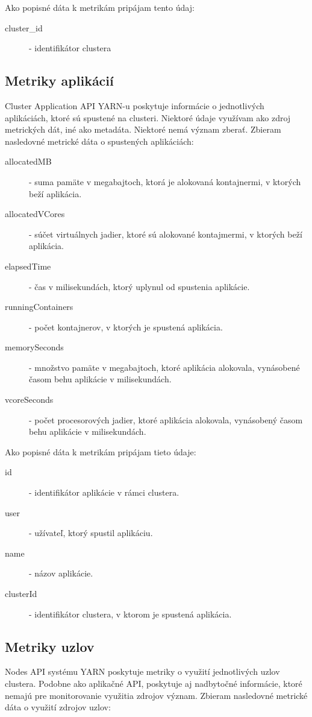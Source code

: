 \documentclass[printed,11pt,twoside,color,cover,table]{fithesis3}
\begin{document}
Ako popisné dáta k metrikám pripájam tento údaj:
\begin{description}
\item[cluster\_id] - identifikátor clustera
\end{description}


\subsection{Metriky aplikácií}
Cluster Application API YARN-u poskytuje informácie o jednotlivých aplikáciách, ktoré sú spustené na clusteri. Niektoré údaje využívam ako zdroj metrických dát, iné ako metadáta. Niektoré nemá význam zberať.
Zbieram nasledovné metrické dáta o spustených aplikáciách:
\begin{description}
\item[allocatedMB] - suma pamäte v megabajtoch, ktorá je alokovaná kontajnermi, v ktorých beží aplikácia.
\item[allocatedVCores] - súčet virtuálnych jadier, ktoré sú alokované kontajmermi, v ktorých beží aplikácia.
\item[elapsedTime] - čas v milisekundách, ktorý uplynul od spustenia aplikácie.
\item[runningContainers] - počet kontajnerov, v ktorých je spustená aplikácia.
\item[memorySeconds] - množstvo pamäte v megabajtoch, ktoré aplikácia alokovala, vynásobené časom behu aplikácie v milisekundách.
\item[vcoreSeconds] - počet procesorových jadier, ktoré aplikácia alokovala, vynásobený časom behu aplikácie v milisekundách.
\end{description}

Ako popisné dáta k metrikám pripájam tieto údaje:
\begin{description}
\item[id] - identifikátor aplikácie v rámci clustera.
\item[user] - užívateľ, ktorý spustil aplikáciu.
\item[name] - názov aplikácie.
\item[clusterId] - identifikátor clustera, v ktorom je spustená aplikácia.
\end{description}

\subsection{Metriky uzlov}
Nodes API systému YARN poskytuje metriky o využití jednotlivých uzlov clustera. Podobne ako aplikačné API, poskytuje aj nadbytočné informácie, ktoré nemajú pre monitorovanie využitia zdrojov význam.
Zbieram nasledovné metrické dáta o využití zdrojov uzlov:
\end{document}
